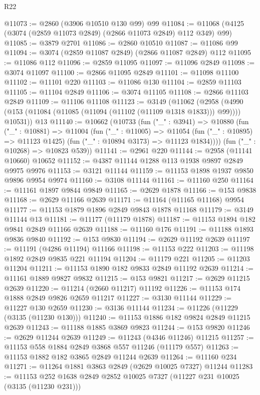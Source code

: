 \begin{lexlean}{R22}
\begin{coremodule}
@11073 := @2860 (@3906 @10510 @130 @99) @99
@11084 := @11068 (@4125 (@3074 (@2859 @11073 @2849) (@2866 @11073 @2849) @112 @349) @99)
@11085 := @3879 @2701
@11086 := @2860 @10510
@11087 := @11086 @99
@11094 := @3074 (@2859 @11087 @2849) (@2866 @11087 @2849) @112
@11095 := @11086 @112
@11096 := @2859 @11095
@11097 := @11096 @2849
@11098 := @3074 @11097
@11100 := @2866 @11095 @2849
@11101 := @11098 @11100
@11102 := @11101 @220
@11103 := @11086 @130
@11104 := @2859 @11103
@11105 := @11104 @2849
@11106 := @3074 @11105
@11108 := @2866 @11103 @2849
@11109 := @11106 @11108
@11123 := @3149
    (@11062
      (@2958 (@4990 (@153 (@11084 (@11085 (@11094 (@11102 (@11109 @1318 @1833))) @99)))) @10531))
    @13
@11140 := @10662
    (@10733
      (fun ("_" : @3941) =>
      @10880
        (fun ("_" : @10881) =>
        @11004
          (fun ("_" : @11005) =>
          @11054 (fun ("_" : @10895) => @11123 @1425) (fun ("_" : @10894 @3173) => @11123 @1834))))
      (fun ("_" : @10268) => @10823 @539))
@11141 := @2961 @220
@11144 := @2958 (@11141 @10660) @10652
@11152 := @4387 @11144 @1288 @113 @1938 @9897 @2849 @9975 @9976
@11153 := @3121 @11144
@11159 := @11153 @1898 @1937 @9850 @9896 @9954 @9974
@11160 := @3108 @11144
@11161 := @11160 @250
@11164 := @11161 @1897 @9844 @9849
@11165 := @2629 @1878
@11166 := @153 @9838
@11168 := @2629 @11166 @2639
@11171 := @11164 (@11165 @11168) @9954
@11177 := @11153 @1879 @1896 @2849 @9843 @1878 @11168
@11179 := @3149 @11144 @13
@11181 := @11177 (@11179 @1878)
@11187 := @11153 @1894 @182 @9841 @2849 @11166 @2639
@11188 := @11160 @176
@11191 := @11188 @1893 @9836 @9840
@11192 := @153 @9830
@11194 := @2629 @11192 @2639
@11197 := @11191 (@4286 @11194) @11166
@11198 := @11153 @222
@11203 := @11198 @1892 @2849 @9835 @221 @11194
@11204 := @11179 @221
@11205 := @11203 @11204
@11211 := @11153 @1890 @182 @9833 @2849 @11192 @2639
@11214 := @11161 @1889 @9827 @9832
@11215 := @153 @9821
@11217 := @2629 @11215 @2639
@11220 := @11214 (@2660 @11217) @11192
@11226 := @11153 @174 @1888 @2849 @9826 @2659 @11217
@11227 := @3130 @11144
@11229 := @11227 @130 @2659
@11230 := @3136 @11144
@11234 := @11226 (@11229 (@3135 (@11230 @130)))
@11240 := @11153 @1886 @182 @9824 @2849 @11215 @2639
@11243 := @11188 @1885 @3869 @9823
@11244 := @153 @9820
@11246 := @2629 @11244 @2639
@11249 := @11243 (@4346 @11246) @11215
@11257 := @11153 @558 @1884 @2849 @3868 @557 @11246 (@11179 @557)
@11263 := @11153 @1882 @182 @3865 @2849 @11244 @2639
@11264 := @11160 @234
@11271 := @11264 @1881 @3863 @2849 (@2629 @10025 @7327) @11244
@11283 := @11153 @252 @1638 @2849 @2852 @10025 @7327 (@11227 @231 @10025 (@3135 (@11230 @231)))

\end{coremodule}
\end{lexlean}
